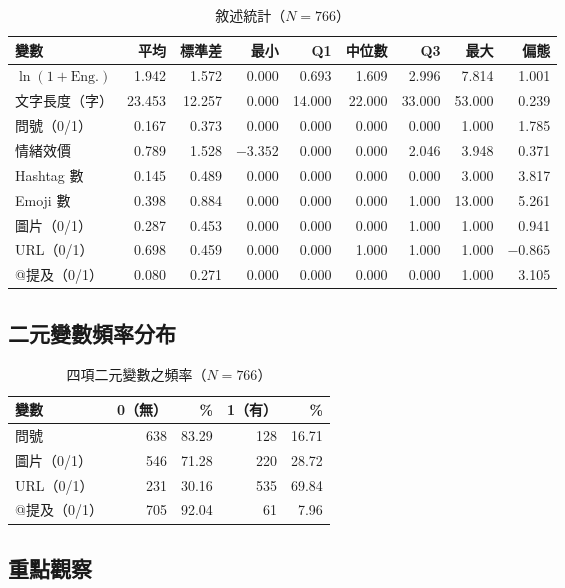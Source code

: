 \documentclass[12pt,a4paper]{ctexart}
\begin{document}
\begin{table}[H]
\centering
\caption{敘述統計（$N=766$）}
\label{tab:desc_full}
\small
\begin{tabular}{lrrrrrrrr}
\toprule
變數 & 平均 & 標準差 & 最小 & Q1 & 中位數 & Q3 & 最大 & 偏態 \\
\midrule
$\ln(1+\text{Eng.})$ & 1.942 & 1.572 & 0.000 & 0.693 & 1.609 & 2.996 & 7.814 & 1.001 \\
文字長度（字）& 23.453 & 12.257 & 0.000 & 14.000 & 22.000 & 33.000 & 53.000 & 0.239 \\
問號（0/1）& 0.167 & 0.373 & 0.000 & 0.000 & 0.000 & 0.000 & 1.000 & 1.785 \\
情緒效價 & 0.789 & 1.528 & $-3.352$ & 0.000 & 0.000 & 2.046 & 3.948 & 0.371 \\
Hashtag 數 & 0.145 & 0.489 & 0.000 & 0.000 & 0.000 & 0.000 & 3.000 & 3.817 \\
Emoji 數 & 0.398 & 0.884 & 0.000 & 0.000 & 0.000 & 1.000 & 13.000 & 5.261 \\
圖片（0/1）& 0.287 & 0.453 & 0.000 & 0.000 & 0.000 & 1.000 & 1.000 & 0.941 \\
URL（0/1）& 0.698 & 0.459 & 0.000 & 0.000 & 1.000 & 1.000 & 1.000 & $-0.865$ \\
@提及（0/1）& 0.080 & 0.271 & 0.000 & 0.000 & 0.000 & 0.000 & 1.000 & 3.105 \\
\bottomrule
\end{tabular}
\end{table}

\subsection{二元變數頻率分布}

\begin{table}[H]
\centering
\caption{四項二元變數之頻率（$N=766$）}
\small
\begin{tabular}{lrrrr}
\toprule
變數 & 0（無）& \% & 1（有）& \% \\
\midrule
問號 & 638 & 83.29 & 128 & 16.71 \\
圖片（0/1）& 546 & 71.28 & 220 & 28.72 \\
URL（0/1）& 231 & 30.16 & 535 & 69.84 \\
@提及（0/1）& 705 & 92.04 & 61 & 7.96 \\
\bottomrule
\end{tabular}
\end{table}

\subsection{重點觀察}
\end{document}
